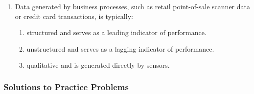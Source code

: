 \begin{enumerate}
	\item Data generated by business processes, such as retail point-of-sale scanner data or credit card transactions, is typically:
	      \begin{enumerate}[label=\Alph*.]
		      \item structured and serves as a leading indicator of performance.
		      \item unstructured and serves as a lagging indicator of performance.
		      \item qualitative and is generated directly by sensors.
	      \end{enumerate}
\end{enumerate}

\subsubsection{Solutions to Practice Problems}
\label{subsec:app_Solutions_M11}

